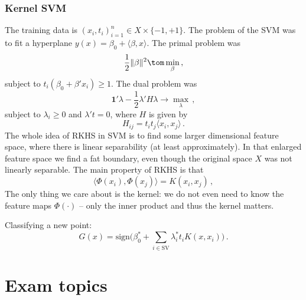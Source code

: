 \documentclass[a4paper]{article}
\newcommand{\one}{\mathbf{1}}
\begin{document}

\subsubsection{Kernel SVM} %
\label{ssub:kernel_svm}

The training data is $(x_i,t_i)_{i=1}^n \in X\times \{-1,+1\}$. The problem of the
SVM was to fit a hyperplane $y(x) = \beta_0 + \langle\beta, x\rangle$.
The primal problem was
\[ \frac{1}{2}\|\beta\|^2 \tom \min_\beta\,, \]
subject to $t_i (\beta_0 + \beta'x_i )\geq 1$.
The dual problem was
\[ \one'\lambda - \frac{1}{2} \lambda'H \lambda \to \max_\lambda\,, \]
subject to $\lambda_i \geq 0$ and $\lambda't = 0$, where $H$ is given by
\[ H_{ij} = t_i t_j \langle x_i,x_j\rangle\,. \]
The whole idea of RKHS in SVM is to find some larger dimensional feature space,
where there is linear separability (at least approximately). In that enlarged
feature space we find a fat boundary, even though the original space $X$ was not
linearly separable. The main property of RKHS is that
\[ \langle \Phi(x_i),\Phi(x_j) \rangle = K(x_i,x_j)\,, \]
The only thing we care about is the kernel: we do not even need to know the feature
maps $\Phi(\cdot)$ -- only the inner product and thus the kernel matters.

Classifying a new point:
\[ G(x) = \text{sign} \bigl( \beta_0^* + \sum_{i\in \text{SV}} \lambda^*_i t_i K(x,x_i) \bigr)\,. \]




\section{Exam topics} %
\label{sec:exam_topics}
\end{document}

